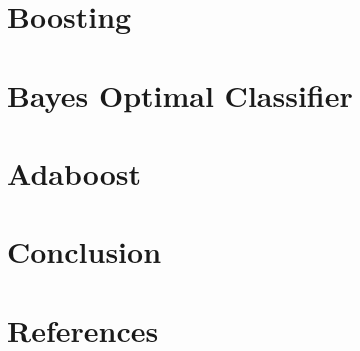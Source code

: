 \documentclass{acmtog} %
\begin{document}
\section{Boosting}
\section{Bayes Optimal Classifier}
\section{Adaboost}
\section{Conclusion}
\section{References}



\end{document}
